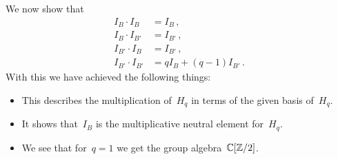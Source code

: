 We now show that
\begin{align*}
  I_B \cdot I_B       &=  I_B \,, \\
  I_B \cdot I_{B'}    &=  I_{B'} \,,  \\
  I_{B'} \cdot I_B    &=  I_{B'} \,,  \\
  I_{B'} \cdot I_{B'} &=  q I_B + (q-1) I_{B'} \,.
\end{align*}
With this we have achieved the following things:
\begin{itemize}
  \item
    This describes the multiplication of~$H_q$ in terms of the given basis of~$H_q$.
  \item
    It shows that~$I_B$ is the multiplicative neutral element for~$H_q$.
  \item
    We see that for~$q = 1$ we get the group algebra~$\mathbb{C}[\mathbb{Z}/2]$.
\end{itemize}

